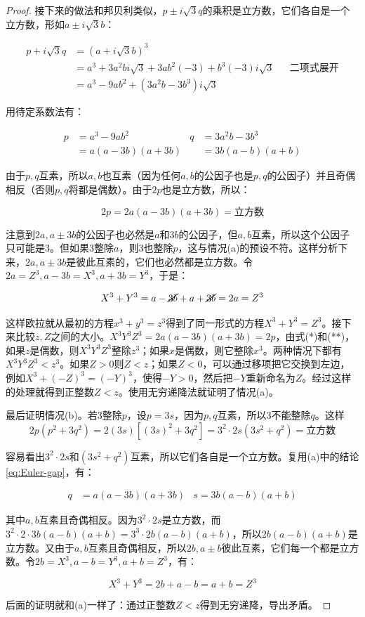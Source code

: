 \documentclass[b5paper]{ctexart}
\begin{document}
\begin{proof}
接下来的做法和邦贝利类似，$p \pm i\sqrt{3}q$的乘积是立方数，它们各自是一个立方数，形如$a \pm i\sqrt{3}b$：

\begin{align*}
p + i\sqrt{3}q &= (a + i\sqrt{3}b)^3 \\
  &= a^3 + 3a^2bi\sqrt{3} + 3ab^2(-3) + b^3(-3)i\sqrt{3} && \text{二项式展开} \\
  &= a^3 - 9ab^2 + (3a^2b - 3b^3)i\sqrt{3}
\end{align*}

用待定系数法有：

\begin{align} \label{eq:Euler-gap}
p &= a^3 - 9ab^2       & q &= 3a^2b - 3b^3 \\
  &= a(a - 3b)(a + 3b) &   &= 3b(a - b)(a + b)
\end{align}

由于$p, q$互素，所以$a, b$也互素（因为任何$a, b$的公因子也是$p, q$的公因子）并且奇偶相反（否则$p, q$将都是偶数）。由于$2p$也是立方数，所以：

\[
2p = 2a(a - 3b)(a + 3b) = \text{立方数}
\]

注意到$2a, a \pm 3b$的公因子也必然是$a$和$3b$的公因子，但$a, b$互素，所以这个公因子只可能是3。但如果3整除$a$，则3也整除$p$，这与情况(a)的预设不符。这样分析下来，$2a, a \pm 3b$是彼此互素的，它们也必然都是立方数。令$2a = Z^3, a - 3b = X^3, a+ 3b = Y^3$，于是：

\[
X^3 + Y^3 = a - \cancel{3b} + a + \cancel{3b} = 2a = Z^3
\]

这样欧拉就从最初的方程$x^3 + y^3 = z^3$得到了同一形式的方程$X^3 + Y^3 = Z^3$。接下来比较$z, Z$之间的大小。$X^3Y^3Z^3 = 2a(a - 3b)(a + 3b) = 2p$，由式(*)和(**)，如果$z$是偶数，则$X^3Y^3Z^3$整除$z^3$；如果$x$是偶数，则它整除$x^3$。两种情况下都有$X^3Y^3Z^3 < z^3$。如果$Z > 0$则$Z < z$；如果$Z < 0$，可以通过移项把它交换到左边，例如$X^3 + (-Z)^3 = (-Y)^3$，使得$-Y > 0$，然后把$-Y$重新命名为$Z$。经过这样的处理就得到正整数$Z < z$。使用无穷递降法就证明了情况(a)。

最后证明情况(b)。若3整除$p$，设$p = 3s$，因为$p, q$互素，所以3不能整除$q$。这样
\[
2p(p^2 + 3q^2) = 2(3s)[(3s)^2 + 3q^2] = 3^2\cdot 2s(3s^2 + q^2) = \text{立方数}
\]

容易看出$3^2\cdot 2s$和$(3s^2 + q^2)$互素，所以它们各自是一个立方数。复用(a)中的结论\cref{eq:Euler-gap}，有：

\begin{align*}
q &= a(a - 3b)(a + 3b)  &  s = 3b(a - b)(a + b)
\end{align*}

其中$a, b$互素且奇偶相反。因为$3^2\cdot 2s$是立方数，而$3^2\cdot 2 \cdot 3b(a - b)(a + b) = 3^3 \cdot 2b(a - b)(a + b)$，所以$2b(a - b)(a + b)$是立方数。又由于$a, b$互素且奇偶相反，所以$2b, a \pm b$彼此互素，它们每一个都是立方数。令$2b = X^3, a - b = Y^3, a + b = Z^3$，有：

\[
X^3 + Y^3 = 2b + a - b = a + b = Z^3
\]

后面的证明就和(a)一样了：通过正整数$Z < z$得到无穷递降，导出矛盾。
\end{proof}
\end{document}
